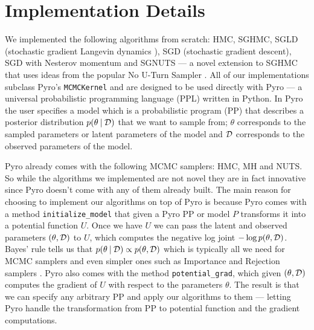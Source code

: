 
\section{Implementation Details}

We implemented the following algorithms from scratch: HMC, SGHMC, SGLD (stochastic gradient Langevin dynamics \cite{sgld}), SGD (stochastic gradient descent), SGD with Nesterov momentum and SGNUTS — a novel extension to SGHMC that uses ideas from the popular No U-Turn Sampler \cite{nuts}. All of our implementations subclass Pyro's \texttt{MCMCKernel} and are designed to be used directly with Pyro \cite{pyro} — a universal probabilistic programming language (PPL) written in Python. In Pyro the user specifies a model which is a probabilistic program (PP) that describes a posterior distribution $p(\theta \: | \: \mathcal{D})$ that we want to sample from; $\theta$ corresponds to the sampled parameters or latent parameters of the model and $\mathcal{D}$ corresponds to the observed parameters of the model. 

Pyro already comes with the following MCMC samplers: HMC, MH and NUTS. So while the algorithms we implemented are not novel they are in fact innovative since Pyro doesn't come with any of them already built. The main reason for choosing to implement our algorithms on top of Pyro is because Pyro comes with a method \texttt{initialize\_model} that given a Pyro PP or model $P$ transforms it into a potential function $U$. Once we have $U$ we can pass the latent and observed parameters $(\theta, \mathcal{D})$ to $U$, which computes the negative log joint $- \log p(\theta, \mathcal{D})$. Bayes' rule tells us that  $p(\theta \: | \: \mathcal{D}) \propto p(\theta, \mathcal{D})$ which is typically all we need for MCMC samplers and even simpler ones such as Importance and Rejection samplers \cite{bishop2006pattern}. Pyro also comes with the method \texttt{potential\_grad}, which given $(\theta, \mathcal{D})$ computes the gradient of $U$ with respect to the parameters $\theta$. The result is that we can specify any arbitrary PP and apply our algorithms to them — letting Pyro handle the transformation from PP to potential function and the gradient computations.

